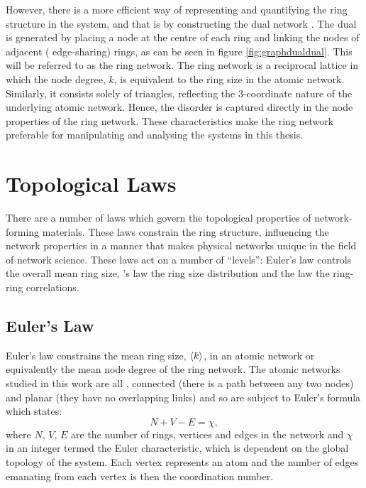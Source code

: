 However, there is a more efficient way of representing and quantifying the ring structure in the system, and that is by constructing the dual network \cite{Aboav1984}.
The dual is generated by placing a node at the centre of each ring and linking the nodes of adjacent (\ie{} edge\--sharing) rings, as can be seen in figure \ref{fig:graphdualdual}.
This will be referred to as the ring network.
The ring network is a reciprocal lattice in which the node degree, $k$, is equivalent to the ring size in the atomic network.
Similarly, it consists solely of triangles, reflecting the 3\--coordinate nature of the underlying atomic network.
Hence, the disorder is captured directly in the node properties of the ring network.
These characteristics make the ring network preferable for manipulating and analysing the systems in this thesis.

\section{Topological Laws}
\label{s:topolaws}

There are a number of laws which govern the topological properties of \td{} network\--forming materials.
These laws constrain the ring structure, influencing the network properties in a manner that makes physical networks unique in the field of network science.
These laws act on a number of ``levels'': Euler's law controls the overall mean ring size, \lm's{} law the ring size distribution and the \aw{} law the ring\--ring correlations.

\subsection{Euler's Law}
\label{s:eulerslaw}

Euler's law constrains the mean ring size, $\langle k \rangle$, in an atomic network or equivalently the mean node degree of the ring network.
The atomic networks studied in this work are all \td{}, connected (there is a path between any two nodes) and planar (they have no overlapping links) and so are subject to Euler's formula which states:
\begin{equation}
	\label{eq:eulerformula}
	N + V - E = \chi,
\end{equation}
where $N$, $V$, $E$ are the number of rings, vertices and edges in the network and $\chi$ in an integer termed the Euler characteristic, which is dependent on the global topology of the system.
Each vertex represents an atom and the number of edges emanating from each vertex is then the coordination number.

